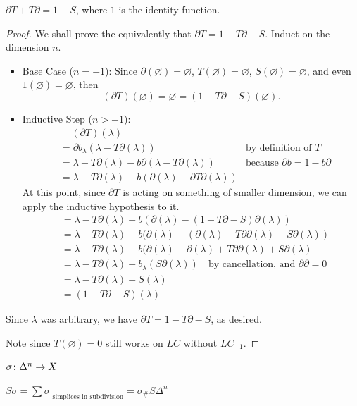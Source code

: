 \documentclass[11pt,leqno,oneside]{amsart}
\numberwithin{thm}{section}
\renewcommand{\null}{\varnothing}
\renewcommand{\d}{\partial}
\begin{document}
\begin{thm}
  $\d T + T \d = 1 - S$, where $1$ is the identity function.
\end{thm}
\begin{proof}
  We shall prove the equivalently that $\d T = 1 - T \d - S$.  Induct on the dimension $n$.
  \begin{itemize}
    \item Base Case ($n = -1$):
    Since $\d(\null) = \null$, $T(\null) = \null$, $S(\null) = \null$, and even $1(\null) = \null$, then
    $$(\d T)(\null) = \null = (1 - T \d - S)(\null).$$

    \item Inductive Step ($n > -1$):
    \begin{align}
      &\quad\, (\d T) (\lambda) \\
      &= \d b_\lambda(\lambda - T \d (\lambda)) &\text{by definition of $T$}\\
      &= \lambda - T \d (\lambda) - b \d(\lambda - T \d (\lambda)) &\text{because $\d b = 1 - b\d$}\\
      &= \lambda - T \d (\lambda) - b (\d(\lambda) - \d T \d (\lambda))
    \end{align}
    At this point, since $\d T$ is acting on something of smaller dimension, we can apply the inductive hypothesis to it.
    \begin{align}
      &= \lambda - T \d (\lambda) - b (\d(\lambda) - (1 - T\d - S) \d (\lambda)) \\
      &= \lambda - T \d (\lambda) - b (\d(\lambda) - (\d(\lambda) - T\d\d(\lambda) - S\d(\lambda)) \\
      &= \lambda - T \d (\lambda) - b (\d(\lambda) - \d(\lambda) + T\d\d(\lambda) + S\d(\lambda) \\
      &= \lambda - T \d (\lambda) - b_\lambda (S\d(\lambda)) \quad\text{by cancellation, and $\d\d = 0$}\\
      &= \lambda - T \d (\lambda) - S (\lambda) \\
      &= (1 - T \d - S)(\lambda)
    \end{align}
  \end{itemize}
  Since $\lambda$ was arbitrary, we have $\d T = 1 - T \d - S$, as desired.

  Note since $T(\null) = 0$ still works on $LC$ without $LC_{-1}$.
\end{proof}

$\sigma \colon \Delta^n \to X$

$S \sigma = \sum \sigma |_{\text{simplices in subdivision}} = \sigma_{\#} S \Delta^n$
\end{document}
